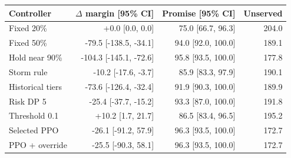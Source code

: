 \begin{tabular}{lrrr}
\toprule
Controller & $\Delta$ margin [95\% CI] & Promise [95\% CI] & Unserved \\
\midrule
Fixed 20\% & +0.0 [0.0, 0.0] & 75.0 [66.7, 96.3] & 204.0 \\
Fixed 50\% & -79.5 [-138.5, -34.1] & 94.0 [92.0, 100.0] & 189.1 \\
Hold near 90\% & -104.3 [-145.1, -72.6] & 95.8 [93.5, 100.0] & 177.8 \\
Storm rule & -10.2 [-17.6, -3.7] & 85.9 [83.3, 97.9] & 190.1 \\
Historical tiers & -73.6 [-126.4, -32.4] & 91.9 [90.3, 100.0] & 189.9 \\
Risk DP 5 & -25.4 [-37.7, -15.2] & 93.3 [87.0, 100.0] & 191.8 \\
Threshold 0.1 & +10.2 [1.7, 21.7] & 86.5 [83.4, 96.5] & 195.2 \\
Selected PPO & -26.1 [-91.2, 57.9] & 96.3 [93.5, 100.0] & 172.7 \\
PPO + override & -25.5 [-90.3, 58.1] & 96.3 [93.5, 100.0] & 172.7 \\
\bottomrule
\end{tabular}
